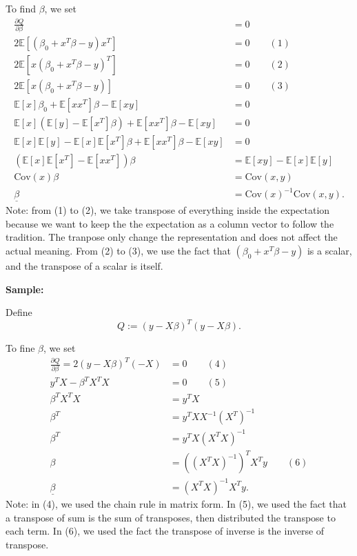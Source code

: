 \documentclass[
]{article}
\begin{document}
To find \(\beta\), we set \begin{align}
    \frac{\partial Q}{\partial \beta} & = 0 \nonumber \\
    2\mathbb{E}\left[(\beta_0+x^T\beta-y)x^T\right] & = 0 \qquad (1)\\
    2\mathbb{E}\left[x(\beta_0+x^T\beta-y)^T\right] & = 0 \qquad (2) \\
    2\mathbb{E}\left[x(\beta_0+x^T\beta-y)\right] & = 0 \qquad (3) \\
    \mathbb{E}\left[x\right]\beta_0 + \mathbb{E}\left[xx^T\right]\beta - \mathbb{E}[xy] & = 0 \nonumber \\
    \mathbb{E}[x]\left(\mathbb{E}[y]-\mathbb{E}\left[x^T\right]\beta\right) + 
    \mathbb{E}\left[xx^T\right]\beta - \mathbb{E}[xy] & = 0 \nonumber \\
    \mathbb{E}[x]\mathbb{E}[y] - \mathbb{E}[x]\mathbb{E}\left[x^T\right]\beta +
    \mathbb{E}\left[xx^T\right]\beta - \mathbb{E}[xy] & = 0 \nonumber \\
    \left(\mathbb{E}[x]\mathbb{E}\left[x^T\right] - \mathbb{E}\left[xx^T\right]\right)\beta & = 
    \mathbb{E}[xy] - \mathbb{E}[x]\mathbb{E}[y] \nonumber \\
    \mathrm{Cov}(x)\beta & = \mathrm{Cov}(x,y) \nonumber \\
    \underline{\beta} & = \mathrm{Cov}(x)^{-1}\mathrm{Cov}(x,y). \nonumber 
\end{align} Note: from (1) to (2), we take transpose of everything
inside the expectation because we want to keep the the expectation as a
column vector to follow the tradition. The tranpose only change the
representation and does not affect the actual meaning. From (2) to (3),
we use the fact that \((\beta_0+x^T\beta-y)\) is a scalar, and the
transpose of a scalar is itself.

\textbf{Sample:}

Define \[Q:= (y-X\beta)^T(y-X\beta).\]

To fine \(\beta\), we set \begin{align}
    \frac{\partial Q}{\partial \beta} = 2(y-X\beta)^T(-X) & = 0 \qquad (4)\\
    y^TX-\beta^TX^TX & = 0  \qquad (5) \\
    \beta^TX^TX & = y^TX \nonumber \\
    \beta^T & = y^TXX^{-1}\left(X^{T}\right)^{-1} \nonumber \\
    \beta^T & = y^TX\left(X^TX\right)^{-1} \nonumber \\
    \beta & = \left(\left(X^TX\right)^{-1}\right)^TX^Ty \qquad (6) \\
    \underline{\beta} & = \left(X^TX\right)^{-1}X^Ty. \nonumber
\end{align} Note: in (4), we used the chain rule in matrix form. In (5),
we used the fact that a transpose of sum is the sum of transposes, then
distributed the transpose to each term. In (6), we used the fact the
transpose of inverse is the inverse of transpose.
\end{document}
